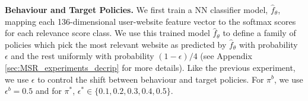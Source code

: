 



\textbf{Behaviour and Target Policies.} 
We first train a NN classifier model, $\hat{f}_\theta$, mapping each 136-dimensional user-website feature vector to the softmax scores for each relevance score class. We use this trained model $\hat{f}_\theta$ to define a family of policies which pick the most relevant website as predicted by $\hat{f}_\theta$ with probability $\epsilon$ and the rest uniformly with probability $(1-\epsilon)/4$ (see Appendix \ref{sec:MSR_experiments_decrip} for more details). Like the previous experiment, we use $\epsilon$ to control the shift between behaviour and target policies. For $\pi^b$, we use $\epsilon^b = 0.5$ and for $\pi^*$, $\epsilon^* \in \{0.1, 0.2, 0.3, 0.4, 0.5\}$. 

